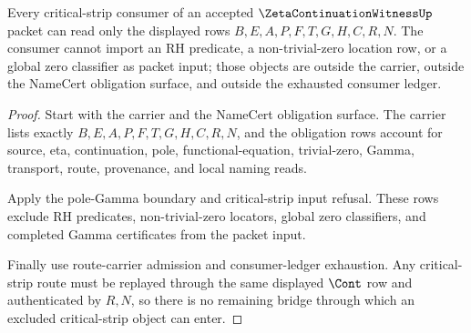 







\begin{theorem}
\label{thm:zeta-continuation-witness-critical-strip-bridge-row}
Every critical-strip consumer of an accepted $\ZetaContinuationWitnessUp$ packet can read only the displayed rows $B,E,A,P,F,T,G,H,C,R,N$. The consumer cannot import an RH predicate, a non-trivial-zero location row, or a global zero classifier as packet input; those objects are outside the carrier, outside the NameCert obligation surface, and outside the exhausted consumer ledger.
\end{theorem}
\begin{proof}
Start with the carrier and the NameCert obligation surface. The carrier lists exactly $B,E,A,P,F,T,G,H,C,R,N$, and the obligation rows account for source, eta, continuation, pole, functional-equation, trivial-zero, Gamma, transport, route, provenance, and local naming reads.

Apply the pole-Gamma boundary and critical-strip input refusal. These rows exclude RH predicates, non-trivial-zero locators, global zero classifiers, and completed Gamma certificates from the packet input.

Finally use route-carrier admission and consumer-ledger exhaustion. Any critical-strip route must be replayed through the same displayed $\Cont$ row and authenticated by $R,N$, so there is no remaining bridge through which an excluded critical-strip object can enter.
\end{proof}

